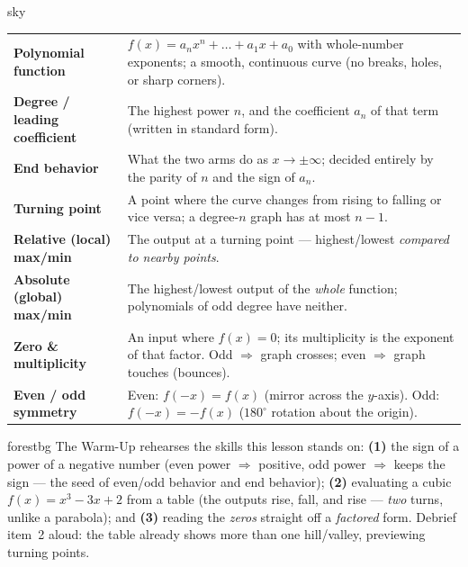 \documentclass[10pt]{article}
\begin{document}
\begin{skillbox}{sky}
\renewcommand{\arraystretch}{1.3}
\begin{tabularx}{\linewidth}{@{}l X@{}}
\textbf{Polynomial function} & $f(x)=a_nx^n+\dots+a_1x+a_0$ with whole-number exponents; a smooth, continuous curve (no breaks, holes, or sharp corners). \\
\textbf{Degree / leading coefficient} & The highest power $n$, and the coefficient $a_n$ of that term (written in standard form). \\
\textbf{End behavior} & What the two arms do as $x\to\pm\infty$; decided entirely by the parity of $n$ and the sign of $a_n$. \\
\textbf{Turning point} & A point where the curve changes from rising to falling or vice versa; a degree-$n$ graph has at most $n-1$. \\
\textbf{Relative (local) max/min} & The output at a turning point --- highest/lowest \emph{compared to nearby points}. \\
\textbf{Absolute (global) max/min} & The highest/lowest output of the \emph{whole} function; polynomials of odd degree have neither. \\
\textbf{Zero \& multiplicity} & An input where $f(x)=0$; its multiplicity is the exponent of that factor. Odd $\Rightarrow$ graph crosses; even $\Rightarrow$ graph touches (bounces). \\
\textbf{Even / odd symmetry} & Even: $f(-x)=f(x)$ (mirror across the $y$-axis). Odd: $f(-x)=-f(x)$ ($180^\circ$ rotation about the origin). \\
\end{tabularx}
\end{skillbox}

\begin{fixedskillbox}{forestbg}
    The Warm-Up rehearses the skills this lesson stands on: \textbf{(1)} the sign of a power of a
    negative number (even power $\Rightarrow$ positive, odd power $\Rightarrow$ keeps the sign --- the
    seed of even/odd behavior and end behavior); \textbf{(2)} evaluating a cubic
    $f(x)=x^3-3x+2$ from a table (the outputs rise, fall, and rise --- \emph{two} turns, unlike a
    parabola); and \textbf{(3)} reading the \emph{zeros} straight off a \emph{factored} form. Debrief
    item~2 aloud: the table already shows more than one hill/valley, previewing turning points.
\end{fixedskillbox}
\end{document}
